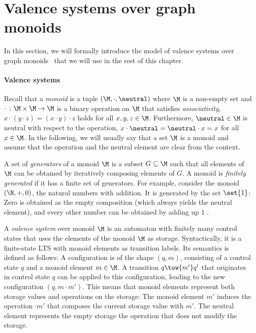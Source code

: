 \documentclass[../../diss.tex]{subfiles}
\begin{document}
\section{Valence systems over graph monoids}%
\label{Valence:Systems}

In this section, we will formally introduce the model of valence systems over graph monoids~\cite{Zetzsche15d} that we will use in the rest of this chapter.

\paragraph{Valence systems}

Recall that a \emph{monoid} is a tuple $(\monoid,\cdot,\neutral)$ where $\monoid$ is a non-empty set and $\cdot \ \colon \monoid \times \monoid \to \monoid$ is a binary operation on $\monoid$ that satisfies \emph{associativity}, \ie $x \cdot (y \cdot z) = (x \cdot y) \cdot z$ holds for all $x,y,z \in \monoid$.
Furthermore, $\neutral \in \monoid$ is neutral with respect to the operation, $x \cdot \neutral = \neutral \cdot x = x$ for all $x \in \monoid$.
In the following, we will usually say that a set $\monoid$ is a monoid and assume that the operation and the neutral element are clear from the context.

A set of \emph{generators} of a monoid $\monoid$ is a subset $G \subseteq \monoid$ such that all elements of $\monoid$ can be obtained by iteratively composing elements of $G$.
A monoid is \emph{finitely generated} if it has a finite set of generators.
%
For example, consider the monoid $(\N,+,0)$, the natural numbers with addition.
It is generated by the set $\set{1}$: Zero is obtained as the empty composition (which always yields the neutral element), and every other number can be obtained by adding up $1$ .

A \emph{valence system} over monoid $\monoid$ is an automaton with finitely many control states that uses the elements of the monoid $\monoid$ as storage.
Syntactically, it is a finite-state LTS with monoid elements as transition labels.
Its semantics is defined as follows:
A configuration is of the shape $(q,m)$, consisting of a control state $q$ and a monoid element $m \in \monoid$.
A transition $q \tow{m'} q'$ that originates in control state $q$ can be applied to this configuration, leading to the new configuration $(q, m \cdot m')$.
%
This means that monoid elements represent both storage values and operations on the storage:
The monoid element $m'$ induces the operation $\cdot m'$ that composes the current storage value with $m'$.
The neutral element represents the empty storage \resp the operation that does not modify the storage.
\end{document}
